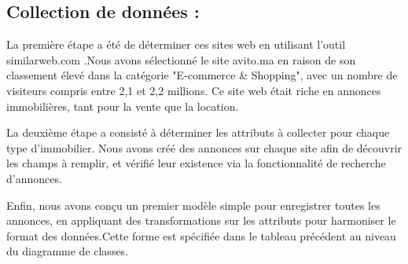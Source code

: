 \documentclass[a4paper,12pt]{report}
\numberwithin{equation}{section}
\begin{document}
\subsection{Collection de données : }
\par
La première étape a été de déterminer ces sites web en utilisant l'outil similarweb.com .Nous avons sélectionné le site avito.ma en raison de son classement élevé dans la catégorie "E-commerce \& Shopping", avec un nombre de visiteurs compris entre 2,1 et 2,2 millions. Ce site web était riche en annonces immobilières, tant pour la vente que la location.
\\ \par
La deuxième étape a consisté à déterminer les attributs à collecter pour chaque type d'immobilier. Nous avons créé des annonces sur chaque site afin de découvrir les champs à remplir, et vérifié leur existence via la fonctionnalité de recherche d'annonces.
\\ \par
Enfin, nous avons conçu un premier modèle simple pour enregistrer toutes les annonces, en appliquant des transformations sur les attributs pour harmoniser le format des données.Cette forme est spécifiée dans le tableau précédent au niveau du diagramme de classes.
\end{document}
